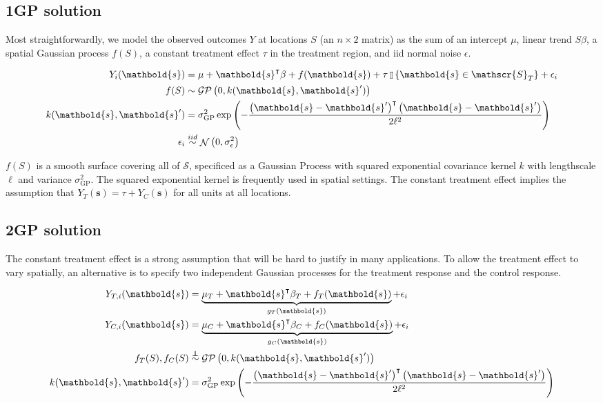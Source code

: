 \documentclass[letter]{article}
\newcommand{\genericdel}[3]{%
      \left#1#3\right#2
    }
\newcommand{\del}[1]{\genericdel(){#1}}
\newcommand{\cbr}[1]{\genericdel\{\}{#1}}
\DeclareMathOperator{\Ind}{\mathbb{I}}
\DeclareMathOperator{\normal}{\mathcal{N}}
\newcommand{\gp}{\mathcal{GP}}
\newcommand{\trans}{^{\intercal}}
\newcommand{\scrS}{\mathscr{S}}
\newcommand{\sigmaf}{\sigma_{\mathrm{GP}}}
\newcommand{\svec}{\mathbold{s}}
\newcommand{\indep}{\protect\mathpalette{\protect\independenT}{\perp}}
\def\independenT#1#2{\mathrel{\rlap{$#1#2$}\mkern2mu{#1#2}}}
\newcommand{\iid}{iid}
\begin{document}
\subsection{1GP solution}\label{gp-solution}

Most straightforwardly, we model the observed outcomes \(Y\) at locations \(S\) (an \(n \times 2\) matrix) as the sum of an intercept \(\mu\), linear trend \(S\beta\), a spatial Gaussian process \(f(S)\), a constant treatment effect \(\tau\) in the treatment region, and iid normal noise \(\epsilon\).

\begin{equation}\begin{split}
Y_i(\svec) &= \mu+\svec\trans\beta + f(\svec) + \tau \Ind\cbr{\svec \in \scrS_T} + \epsilon_i \\
f(S) &\sim \gp\del{0, k(\svec, \svec')} \\
k(\svec,\svec') &= \sigmaf^2 \exp\del{ - \frac{\del{\svec-\svec'}\trans\del{\svec-\svec'}}{2 \ell^2}} \\
\epsilon_i &\overset{\iid}{\sim} \normal\del{0,\sigma_\epsilon^2}
\end{split}\end{equation}

\(f(S)\) is a smooth surface covering all of \(\scrS\), specificed as a Gaussian Process with squared exponential covariance kernel \(k\) with lengthscale \(\ell\) and variance \(\sigmaf^2\). The squared exponential kernel is frequently used in spatial settings. The constant treatment effect implies the assumption that \(Y_T(\svec) = \tau + Y_C(\svec)\) for all units at all locations.
    


    	\subsection{2GP solution}\label{gp-solution}
    

\label{sec:twogp}
    	The constant treatment effect is a strong assumption that will be hard to justify in many applications. To allow the treatment effect to vary spatially, an alternative is to specify two independent Gaussian processes for the treatment response and the control response.

\begin{equation}
\label{eq:spec2gp}
\begin{split}
Y_{T,i}(\svec) &= \underbrace{\mu_T + \svec\trans\beta_T + f_T(\svec)}_{g_T(\svec)} + \epsilon_i \\
Y_{C,i}(\svec) &= \underbrace{\mu_C + \svec\trans\beta_C + f_C(\svec)}_{g_C(\svec)} + \epsilon_i \\
f_T(S), f_C(S) &\overset{\indep}{\sim} \gp\del{0, k(\svec, \svec')} \\
k(\svec,\svec') &= \sigmaf^2 \exp\del{ - \frac{\del{\svec-\svec'}\trans\del{\svec-\svec'}}{2 \ell^2}}
\end{split}
\end{equation}
\end{document}

